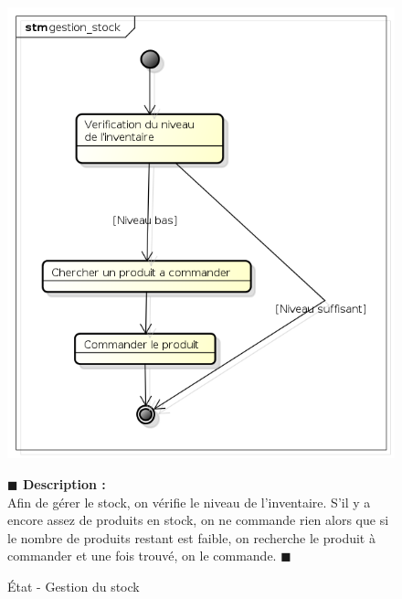 \documentclass[11pt, titlepage]{report}
\newcommand{\debutDescription}{\noindent\textbf{\textcolor{DescriptionColor}{$\blacksquare$  Description : \\}}}
\newcommand{\finDescription}{\noindent\textcolor{DescriptionColor}{$\blacksquare$}}
\begin{document}
\begin{figure}[h!]
\begin{center}
\includegraphics[scale=.4]{../images/diagrammes/uml/exigence_4/etat_gestion_stock.png} 
\caption{État - Gestion du stock}
\end{center}
\debutDescription
	Afin de gérer le stock, on vérifie le niveau de l'inventaire. S'il y a encore assez de produits en stock, on ne commande rien alors que si le nombre de produits restant est faible, on recherche le produit à commander et une fois trouvé, on le commande.
\finDescription
\end{figure}
\end{document}
